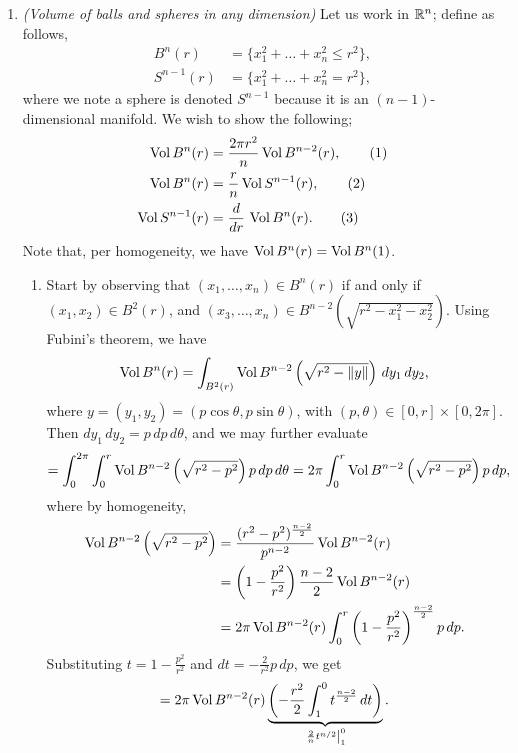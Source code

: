 \begin{enumerate}[label=(\alph*)]
    \item \textit{(Volume of balls and spheres in any dimension)} Let us work in $\mathbb R^n$; define as follows,
    \begin{align*}
        B^n(r) &= \{x_1^2 + \dots + x_n^2 \leq r^2\}, \\
        S^{n-1}(r) &= \{x_1^2 + \dots + x_n^2 = r^2\},
    \end{align*}
    where we note a sphere is denoted $S^{n-1}$ because it is an $(n-1)$-dimensional manifold. We wish to show the following;
    \begin{align*}
        \operatorname{Vol} B^n(r) &= \frac{2\pi r^2}{n} \operatorname{Vol} B^{n-2}(r), \tag{1} \\
        \operatorname{Vol} B^n(r) &= \frac{r}{n} \operatorname{Vol} S^{n-1}(r), \tag{2} \\
        \operatorname{Vol} S^{n-1}(r) &= \frac{d}{dr} \, \operatorname{Vol} B^n(r). \tag{3}
    \end{align*}
    Note that, per homogeneity, we have $\operatorname{Vol} B^n(r) = \operatorname{Vol} B^n(1)$.
    \begin{enumerate}[label=(\roman*)]
        \item Start by observing that $(x_1, \dots, x_n) \in B^n(r)$ if and only if $(x_1, x_2) \in B^2(r)$, and $(x_3, \dots, x_n) \in B^{n-2}(\sqrt{r^2 - x_1^2 - x_2^2})$. Using Fubini's theorem, we have
        \[ \operatorname{Vol} B^n(r) = \int_{B^2(r)} \operatorname{Vol} B^{n-2} \left(\sqrt{r^2 - \left\lVert y \right\rVert}\right) \, dy_1 \, dy_2, \]
        where $y = (y_1, y_2) = (p \cos \theta, p \sin \theta)$, with $(p, \theta) \in [0, r] \times [0, 2\pi]$. Then $dy_1 \, dy_2 = p \, dp \, d\theta$, and we may further evaluate
        \[ = \int_0^{2\pi} \int_0^r \operatorname{Vol} B^{n-2} \left(\sqrt{r^2 - p^2}\right) p \, dp \, d\theta = 2\pi \int_0^r \operatorname{Vol} B^{n-2} \left(\sqrt{r^2 - p^2}\right) p \, dp, \]
        where by homogeneity,
        \begin{align*}
            \operatorname{Vol} B^{n-2} \left(\sqrt{r^2 - p^2}\right) &= \frac{(r^2 - p^2)^{\frac{n-2}{2}}}{p^{n-2}} \operatorname{Vol} B^{n-2}(r) \\
            &= \left(1 - \frac{p^2}{r^2}\right) \frac{n-2}{2} \operatorname{Vol} B^{n-2}(r) \\
            &= 2\pi \operatorname{Vol} B^{n-2}(r) \int_0^r \left(1 - \frac{p^2}{r^2}\right)^{\frac{n-2}{2}} p \, dp.
        \end{align*}
        Substituting $t = 1 - \frac{p^2}{r^2}$ and $dt = - \frac{2}{r^2} p \, dp$, we get
        \[ = 2\pi \operatorname{Vol} B^{n-2}(r) \underbrace{\left(-\frac{r^2}{2} \int_1^0 t^{\frac{n-2}{2}} \, dt\right)}_{\left.\frac{2}{n} t^{n/2}\right\rvert_{1}^{0}}. \]
    \end{enumerate}

\end{enumerate}